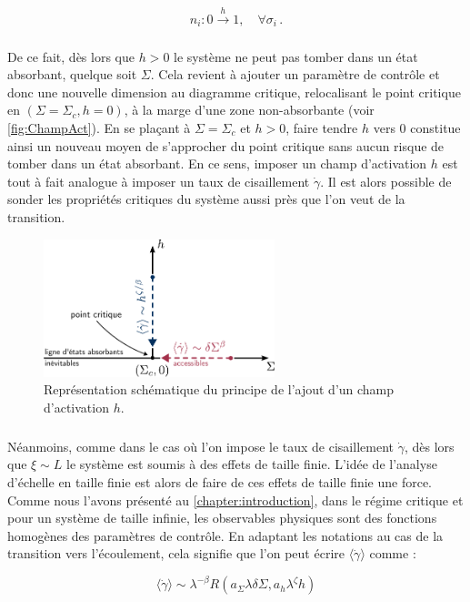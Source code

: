 \begin{equation}
n_i: 0\xrightarrow{h}1,\quad \forall \sigma_i \, .
\end{equation}

\subparagraph{}De ce fait, dès lors que $h>0$ le système ne peut pas tomber dans un état absorbant, quelque soit $\Sigma$. Cela revient à ajouter un paramètre de contrôle et donc une nouvelle dimension au diagramme critique, relocalisant le point critique en $(\Sigma = \Sigma_c, h=0)$, à la marge d'une zone non-absorbante (voir \autoref{fig:ChampAct}). En se plaçant à $\Sigma = \Sigma_c$ et $h>0$, faire tendre $h$ vers $0$ constitue ainsi un nouveau moyen de s'approcher du point critique sans aucun risque de tomber dans un état absorbant. En ce sens, imposer un champ d'activation $h$ est tout à fait analogue à imposer un taux de cisaillement $\dot{\gamma}$. Il est alors possible de sonder les propriétés critiques du système aussi près que l'on veut de la transition.

\begin{figure}
	\centering
	\includegraphics[width=0.6\textwidth]{Chapitre4/Figures/CasPhysique/ApprocheFSS.pdf}
	\caption{Représentation schématique du principe de l'ajout d'un champ d'activation $h$.}
	\label{fig:ChampAct}
\end{figure}

\subparagraph{}Néanmoins, comme dans le cas où l'on impose le taux de cisaillement $\dot{\gamma}$, dès lors que $\xi \sim L$ le système est soumis à des effets de taille finie. L'idée de l'analyse d'échelle en taille finie est alors de faire de ces effets de taille finie une force. Comme nous l'avons présenté au \autoref{chapter:introduction}, dans le régime critique et pour un système de taille infinie, les observables physiques sont des fonctions homogènes des paramètres de contrôle. En adaptant les notations au cas de la transition vers l'écoulement, cela signifie que l'on peut écrire $ \langle \dot{\gamma} \rangle$ comme :

\begin{equation}
\langle\dot{\gamma}\rangle \sim \lambda^{-\beta}R(a_\Sigma\lambda\delta\Sigma, a_h\lambda^\zeta h)
\end{equation}

